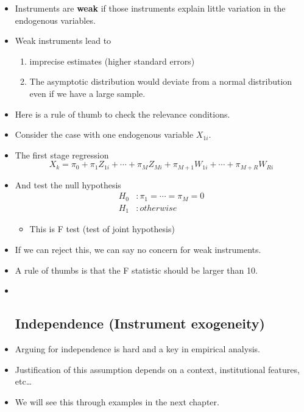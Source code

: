 \documentclass[]{book}
\providecommand{\tightlist}{%
  \setlength{\itemsep}{0pt}\setlength{\parskip}{0pt}}
\begin{document}
\begin{itemize}
\item
  Instruments are \textbf{weak} if those instruments explain little
  variation in the endogenous variables.
\item
  Weak instruments lead to

  \begin{enumerate}
  \def\labelenumi{\arabic{enumi}.}
  \tightlist
  \item
    imprecise estimates (higher standard errors)
  \item
    The asymptotic distribution would deviate from a normal distribution
    even if we have a large sample.
  \end{enumerate}
\item
  Here is a rule of thumb to check the relevance conditions.
\item
  Consider the case with one endogenous variable \(X_{1i}\).
\item
  The first stage regression\\
  \[
  X_k = \pi_0 + \pi_1 Z_{1i} + \cdots + \pi_M Z_{Mi} + \pi_{M+1} W_{1i} + \cdots + \pi_{M+R} W_{Ri}
  \]
\item
  And test the null hypothesis \[
  \begin{aligned}
  H_0 & : \pi_1 = \cdots = \pi_M = 0 \\ 
  H_1 & : otherwise
  \end{aligned}
  \]

  \begin{itemize}
  \tightlist
  \item
    This is F test (test of joint hypothesis)
  \end{itemize}
\item
  If we can reject this, we can say no concern for weak instruments.
\item
  A rule of thumbs is that the F statistic should be larger than 10.
\item ~
  \subsection{Independence (Instrument
  exogeneity)}\label{independence-instrument-exogeneity}
\item
  Arguing for independence is hard and a key in empirical analysis.
\item
  Justification of this assumption depends on a context, institutional
  features, etc\ldots{}
\item
  We will see this through examples in the next chapter.
\end{itemize}
\end{document}
